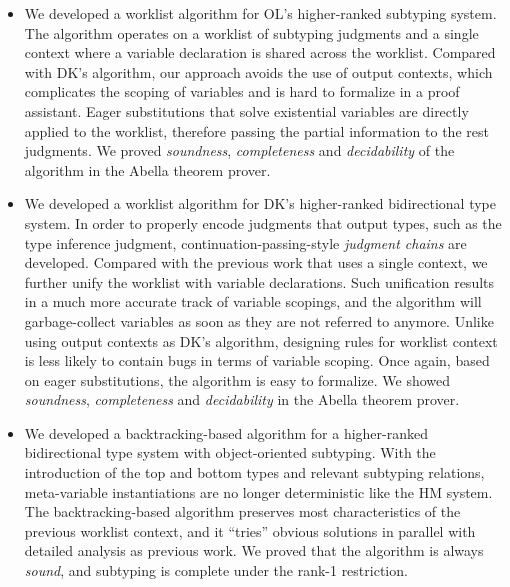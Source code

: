 \begin{itemize}
    \item We developed a worklist algorithm for OL's higher-ranked subtyping system.
        The algorithm operates on a worklist of subtyping judgments and
        a single context where a variable declaration is shared across the worklist.
        Compared with DK's algorithm, our approach avoids the use of output contexts,
        which complicates the scoping of variables and is hard to formalize
        in a proof assistant.
        Eager substitutions that solve existential variables are directly applied to
        the worklist, therefore passing the partial information to the rest judgments.
        We proved \emph{soundness}, \emph{completeness} and \emph{decidability} of
        the algorithm in the Abella theorem prover.

    \item We developed a worklist algorithm for DK's higher-ranked bidirectional type system.
        In order to properly encode judgments that
        output types, such as the type inference judgment,
        continuation-passing-style \emph{judgment chains} are developed.
        Compared with the previous work that uses a single context,
        we further unify the worklist with variable declarations.
        Such unification results in a much more accurate track of variable scopings,
        and the algorithm will garbage-collect variables
        as soon as they are not referred to anymore.
        Unlike using output contexts as DK's algorithm,
        designing rules for worklist context is less likely to contain bugs
        in terms of variable scoping.
        Once again, based on eager substitutions, the algorithm is easy to formalize.
        We showed \emph{soundness}, \emph{completeness} and \emph{decidability}
        in the Abella theorem prover.

    \item We developed a backtracking-based algorithm for a higher-ranked
        bidirectional type system with object-oriented subtyping.
        With the introduction of the top and bottom types and relevant subtyping relations,
        meta-variable instantiations are no longer deterministic like the HM system.
        The backtracking-based algorithm preserves most characteristics of the previous
        worklist context, and it ``tries'' obvious solutions in parallel with detailed analysis
        as previous work.
        We proved that the algorithm is always \emph{sound},
        and subtyping is complete under the rank-1 restriction.
\end{itemize}


